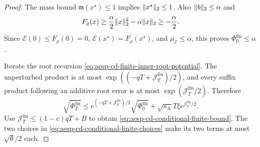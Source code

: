 \begin{proof}
The mass bound $\mathfrak m(x^\star)\leq1$ implies
$\lVert x^\star\rVert_2\leq1$.  Also $\lVert b\rVert_2\leq\alpha$ and
\begin{equation*}
 F_\rho(x)\geq\frac\alpha2\lVert x\rVert_2^2
             -\alpha\lVert x\rVert_2\geq-\frac\alpha2.
\end{equation*}
Since $\mathcal E(0)\leq F_\rho(0)=0$,
$\mathcal E(x^\star)=F_\rho(x^\star)$, and
$\mu_{\mathcal E}\leq\alpha$, this proves
$\Phi_0^{\mathrm{fin}}\leq\alpha$.

Iterate the root recursion
\cref{eq:aesp-cd-finite-inner-root-potential}.  The unperturbed product is at
most $\exp((-qT+\mathcal J_T^{\mathrm{fin}})/2)$, and every suffix product
following an additive root error is at most
$\exp(\mathcal J_T^{\mathrm{fin}}/2)$.  Therefore
\begin{equation*}
 \sqrt{\Phi_T^{\mathrm{fin}}}
 \leq e^{(-qT+\mathcal J_T^{\mathrm{fin}})/2}
       \sqrt{\Phi_0^{\mathrm{fin}}}
   +\sqrt{\kappa_{\mathrm A}}T\xi
       e^{\mathcal J_T^{\mathrm{fin}}/2}.
\end{equation*}
Use $\mathcal J_T^{\mathrm{fin}}\leq(1-c)qT+B$ to obtain
\cref{eq:aesp-cd-conditional-finite-bound}.  The two choices in
\cref{eq:aesp-cd-conditional-finite-choices} make its two terms at most
$\sqrt\theta/2$ each.
\end{proof}

